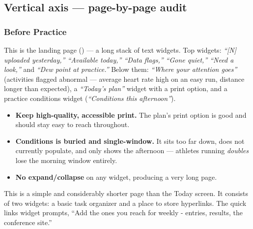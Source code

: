 
\subsection{Vertical axis --- page-by-page audit}

\subsubsection{Before Practice}

\par
This is the landing page () --- a long stack of text widgets. Top widgets: \emph{``[N] uploaded yesterday,'' ``Available today,'' ``Data flags,'' ``Gone quiet,'' ``Need a look,''} and \emph{``Dew point at practice.''} Below them: \emph{``Where your attention goes''} (activities flagged abnormal --- average heart rate high on an easy run, distance longer than expected), a \emph{``Today's plan''} widget with a print option, and a practice conditions widget (\emph{``Conditions this afternoon''}).
\begin{itemize}
  \item \textbf{Keep high-quality, accessible print.} The plan's print option is good and should stay easy to reach throughout.
  \item \textbf{Conditions is buried and single-window.} It sits too far down, does not currently populate, and only shows the afternoon --- athletes running \emph{doubles} lose the morning window entirely.
  \item \textbf{No expand/collapse} on any widget, producing a very long page.
\end{itemize}

\par
This is a simple and considerably shorter page than the Today screen. It consists of two widgets: a basic task organizer and a place to store hyperlinks. The quick links widget prompts, ``Add the ones you reach for weekly - entries, results, the conference site.''

